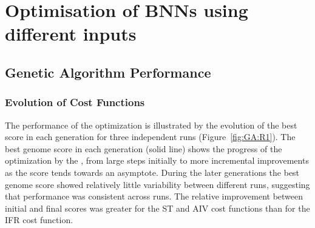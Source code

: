 \section{Optimisation of {BNN}s using different  inputs}\label{sec:GA:ResultDiffAN}






\subsection{Genetic Algorithm Performance}


\subsubsection{Evolution of Cost Functions}

The performance of the {\GA} optimization is illustrated by the evolution of the
best score in each generation for three independent {\GA} runs
(Figure~\ref{fig:GA:R1}). The best genome score in each generation (solid line)
shows the progress of the optimization by the {\GA}, from large steps initially to
more incremental improvements as the score tends towards an asymptote.  During
the later generations the best genome score showed relatively little variability
between different {\GA} runs, suggesting that {\GA} performance was consistent across
runs. The relative improvement between initial and final scores was greater for
the ST and AIV cost functions than for the IFR cost function.

